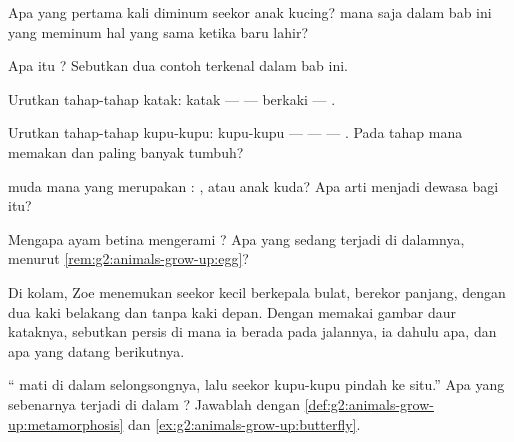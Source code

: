 \begin{exercise}[$\star$]\label{exo:g2:animals-grow-up:3}
Apa yang pertama kali diminum seekor anak kucing?  mana saja
dalam bab ini yang meminum hal yang sama ketika baru lahir?
\end{exercise}

\begin{exercise}[$\star$]\label{exo:g2:animals-grow-up:4}
Apa itu ? Sebutkan dua contoh terkenal dalam bab ini.
\end{exercise}

\begin{exercise}[$\star$]\label{exo:g2:animals-grow-up:5}
Urutkan tahap-tahap katak: katak ---  ---  berkaki ---
.
\end{exercise}

\begin{exercise}[$\star$]\label{exo:g2:animals-grow-up:6}
Urutkan tahap-tahap kupu-kupu: kupu-kupu ---  ---  ---
. Pada tahap mana  memakan  dan paling banyak
tumbuh?
\end{exercise}

\begin{exercise}[$\star$]\label{exo:g2:animals-grow-up:7}
 muda mana yang merupakan : , atau
anak kuda? Apa arti menjadi dewasa bagi  itu?
\end{exercise}

\begin{exercise}[$\star$]\label{exo:g2:animals-grow-up:8}
Mengapa ayam betina mengerami ? Apa yang sedang terjadi di
dalamnya, menurut \cref{rem:g2:animals-grow-up:egg}?
\end{exercise}

\begin{exercise}[$\star\star$]\label{exo:g2:animals-grow-up:9}
Di kolam, Zoe menemukan seekor  kecil berkepala bulat, berekor
panjang, dengan dua kaki belakang dan tanpa kaki depan. Dengan memakai
gambar daur kataknya, sebutkan persis di mana ia berada pada jalannya,
ia dahulu apa, dan apa yang datang berikutnya.
\end{exercise}

\begin{exercise}[$\star\star$]\label{exo:g2:animals-grow-up:10}
`` mati di dalam selongsongnya, lalu seekor kupu-kupu pindah ke
situ.'' Apa yang sebenarnya terjadi di dalam ? Jawablah
dengan \cref{def:g2:animals-grow-up:metamorphosis} dan
\cref{ex:g2:animals-grow-up:butterfly}.
\end{exercise}
